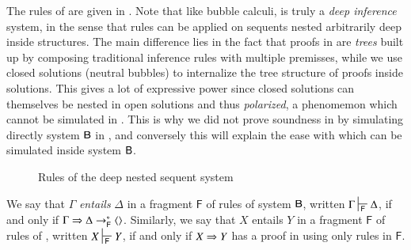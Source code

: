 The rules of  are given in . Note that like
bubble calculi,  is truly a \emph{deep inference} system, in the
sense that rules can be applied on sequents nested arbitrarily deep inside
structures. The main difference lies in the fact
that proofs in  are \emph{trees} built up by composing traditional
inference rules with multiple premisses, while we use closed solutions (neutral
bubbles) to internalize the tree structure of proofs inside solutions. This
gives a lot of expressive power since closed solutions can themselves be nested
in open solutions and thus \emph{polarized}, a phenomemon which cannot be
simulated in . This is why we did not prove soundness in
 by simulating directly system $\sysB$ in
, and conversely this will explain the ease with which 
can be simulated inside system $\sysB$.

\begin{figure*}
  
  \caption{Rules of the deep nested sequent system }
\end{figure*}

\begin{definition}
  We say that $\Gamma$ \emph{entails} $\Delta$ in a fragment $\mathsf{F}$ of
  rules of system $\sysB$, written $\Gamma \prov{\mathsf{F}} \Delta$, if and
  only if $\Gamma \Rightarrow \Delta \rightarrow^\ast_{\mathsf{F}} \mathbin{\langle  \rangle}$. Similarly, we say
  that $X$ entails $Y$ in a fragment $\mathsf{F}$ of rules of ,
  written $X \prov{\mathsf{F}} Y$, if and only if $X \Rightarrow Y$ has a proof in
   using only rules in $\mathsf{F}$.
\end{definition}

